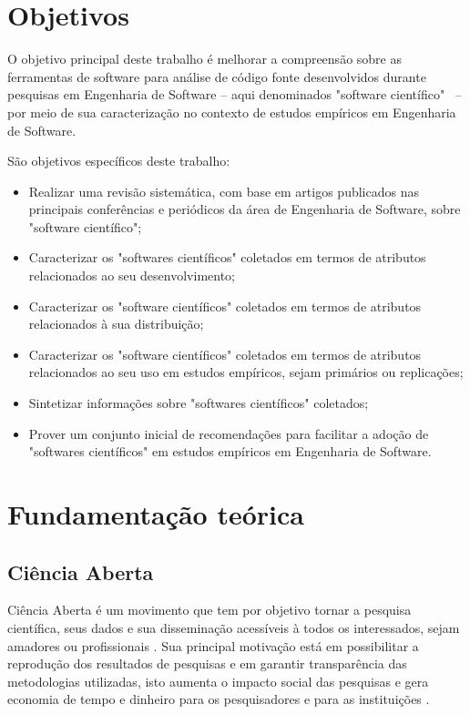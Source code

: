 \documentclass[12pt]{article}
\begin{document}
\section{Objetivos}

O objetivo principal deste trabalho é melhorar a compreensão sobre as
ferramentas de software para análise de código fonte desenvolvidos durante
pesquisas em Engenharia de Software -- aqui denominados "software científico"
\ -- por meio de sua caracterização no contexto de estudos empíricos em
Engenharia de Software.

São objetivos específicos deste trabalho:

\begin{itemize}
  \item Realizar uma revisão sistemática, com base em artigos publicados nas
    principais conferências e periódicos da área de Engenharia de Software,
    sobre "software científico";
  \item Caracterizar os "softwares científicos" coletados em termos de
    atributos relacionados ao seu desenvolvimento;
  \item Caracterizar os "software científicos" coletados em termos de
    atributos relacionados à sua distribuição;
  \item Caracterizar os "software científicos" coletados  em termos de
    atributos relacionados ao seu uso em estudos empíricos, sejam primários ou
    replicações;
  \item Sintetizar informações sobre "softwares científicos" coletados;
  \item Prover um conjunto inicial de recomendações para facilitar a adoção de
    "softwares científicos" em estudos empíricos em Engenharia de Software. 
\end{itemize}

\section{Fundamentação teórica}

\subsection{Ciência Aberta}

Ciência Aberta é um movimento que tem por objetivo tornar a pesquisa
científica, seus dados e sua disseminação acessíveis à todos os interessados,
sejam amadores ou profissionais \cite{WikipediaOpenScience}. Sua principal
motivação está em possibilitar a reprodução dos resultados de pesquisas e em
garantir transparência das metodologias utilizadas, isto aumenta o impacto
social das pesquisas e gera economia de tempo e dinheiro para os pesquisadores
e para as instituições \cite{Nesta2010}.
\end{document}

